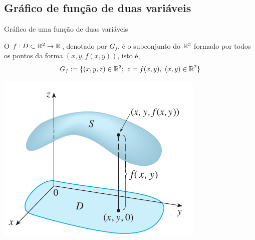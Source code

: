 \subsection*{Gráfico de função de duas variáveis}
\begin{frame}[label=funcoes]{Gráfico de uma função de duas variáveis}

O  $f:D\subset \mathbb{R}^2\to \mathbb{R}$, denotado por $G_f$, é o subconjunto do $\mathbb{R}^{3}$ formado por todos os pontos  da forma $(x,y,f(x,y))$, isto é,
\[G_f:=\{(x,y,z)\in \R^{3};\ z=f(x,y),\ (x,y)\in \R^2\}\] 

\begin{center}
	\includegraphics[scale=0.5]{figuras/grafico-f.png}
\end{center}




\end{frame}


